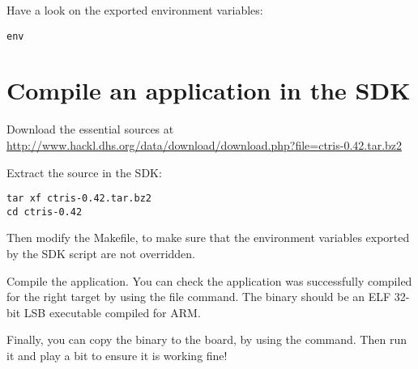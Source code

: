 Have a look on the exported environment variables:
\begin{verbatim}
env
\end{verbatim}

\section{Compile an application in the SDK}

Download the essential  sources at
\url{http://www.hackl.dhs.org/data/download/download.php?file=ctris-0.42.tar.bz2}

Extract the source in the SDK:
\begin{verbatim}
tar xf ctris-0.42.tar.bz2
cd ctris-0.42
\end{verbatim}

Then modify the Makefile, to make sure that the environment variables exported
by the SDK script are not overridden.

Compile the application. You can check the application was
successfully compiled for the right target by using the file command.
The  binary should be an ELF 32-bit LSB executable
compiled for ARM.

Finally, you can copy the binary to the board, by using the 
command. Then run it and play a bit to ensure it is working fine!
